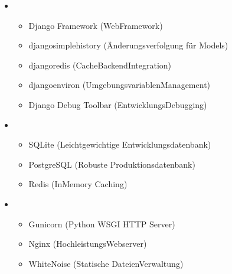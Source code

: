 \documentclass[a4paper,12pt,ngerman]{sphinxmanual}
\begin{document}
\sphinxAtStartPar
{}
\begin{itemize}
\item {} 
\sphinxAtStartPar
{}
\begin{itemize}
\item {} 
\sphinxAtStartPar
Django Framework (Web\sphinxhyphen{}Framework)

\item {} 
\sphinxAtStartPar
django\sphinxhyphen{}simple\sphinxhyphen{}history (Änderungsverfolgung für Models)

\item {} 
\sphinxAtStartPar
django\sphinxhyphen{}redis (Cache\sphinxhyphen{}Backend\sphinxhyphen{}Integration)

\item {} 
\sphinxAtStartPar
django\sphinxhyphen{}environ (Umgebungsvariablen\sphinxhyphen{}Management)

\item {} 
\sphinxAtStartPar
Django Debug Toolbar (Entwicklungs\sphinxhyphen{}Debugging)

\end{itemize}

\item {} 
\sphinxAtStartPar
{}
\begin{itemize}
\item {} 
\sphinxAtStartPar
SQLite (Leichtgewichtige Entwicklungsdatenbank)

\item {} 
\sphinxAtStartPar
PostgreSQL (Robuste Produktionsdatenbank)

\item {} 
\sphinxAtStartPar
Redis (In\sphinxhyphen{}Memory Caching)

\end{itemize}

\item {} 
\sphinxAtStartPar
{}
\begin{itemize}
\item {} 
\sphinxAtStartPar
Gunicorn (Python WSGI HTTP Server)

\item {} 
\sphinxAtStartPar
Nginx (Hochleistungs\sphinxhyphen{}Webserver)

\item {} 
\sphinxAtStartPar
WhiteNoise (Statische Dateien\sphinxhyphen{}Verwaltung)


\end{itemize}
\end{itemize}
\end{document}
